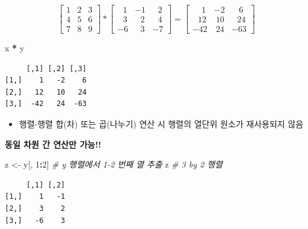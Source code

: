 \documentclass[
  11pt,
]{krantz}
\makeatletter
\newenvironment{Shaded}{\begin{snugshade}}{\end{snugshade}}
\newcommand{\CommentTok}[1]{\textcolor[rgb]{0.37,0.37,0.37}{\textit{#1}}}
\newcommand{\DecValTok}[1]{\textcolor[rgb]{0.06,0.06,0.06}{#1}}
\newcommand{\NormalTok}[1]{#1}
\newcommand{\OperatorTok}[1]{\textcolor[rgb]{0.43,0.43,0.43}{\textbf{#1}}}
\newcommand{\StringTok}[1]{\textcolor[rgb]{0.5,0.5,0.5}{#1}}
\providecommand{\tightlist}{%
  \setlength{\itemsep}{0pt}\setlength{\parskip}{0pt}}
\newenvironment{kframe}{%
\medskip{}
\setlength{\fboxsep}{.8em}
 \def\at@end@of@kframe{}%
 \ifinner\ifhmode%
  \def\at@end@of@kframe{\end{minipage}}%
  \begin{minipage}{\columnwidth}%
 \fi\fi%
 \def\FrameCommand##1{\hskip\@totalleftmargin \hskip-\fboxsep
 \colorbox{shadecolor}{##1}\hskip-\fboxsep
     \hskip-\linewidth \hskip-\@totalleftmargin \hskip\columnwidth}%
 \MakeFramed {\advance\hsize-\width
   \@totalleftmargin\z@ \linewidth\hsize
   \@setminipage}}%
 {\par\unskip\endMakeFramed%
 \at@end@of@kframe}
\renewenvironment{quote}{\begin{kframe}}{\end{kframe}}
\makeatother
\begin{document}
\[\begin{bmatrix}
1 & 2 & 3 \\
4 & 5 & 6 \\ 
7 & 8 & 9
\end{bmatrix} *  
\begin{bmatrix}
~~~1 & -1 &  ~~~2 \\
~~~3 & ~~~2 & ~~~4 \\ 
-6 & ~~~3 & -7
\end{bmatrix} 
 = 
\begin{bmatrix}
~~~~~ 1  & -2  &  ~~~~6 \\
~~~  12  & ~10 &  ~~~24 \\ 
    -42  & ~24 & -63
\end{bmatrix}
\]

\footnotesize

\begin{Shaded}
\begin{Highlighting}[]
\NormalTok{x }\OperatorTok{*}\StringTok{ }\NormalTok{y}
\end{Highlighting}
\end{Shaded}

\begin{verbatim}
     [,1] [,2] [,3]
[1,]    1   -2    6
[2,]   12   10   24
[3,]  -42   24  -63
\end{verbatim}

\normalsize

\begin{itemize}
\tightlist
\item
  행렬-행렬 합(차) 또는 곱(나누기) 연산 시 행렬의 열단위 원소가 재사용되지 않음
\end{itemize}

\begin{quote}
\textbf{동일 차원 간 연산만 가능!!}
\end{quote}

\footnotesize

\begin{Shaded}
\begin{Highlighting}[]
\NormalTok{z <-}\StringTok{ }\NormalTok{y[, }\DecValTok{1}\OperatorTok{:}\DecValTok{2}\NormalTok{] }\CommentTok{# y 행렬에서 1-2 번째 열 추출}
\NormalTok{z }\CommentTok{# 3 by 2 행렬}
\end{Highlighting}
\end{Shaded}

\begin{verbatim}
     [,1] [,2]
[1,]    1   -1
[2,]    3    2
[3,]   -6    3
\end{verbatim}
\end{document}
